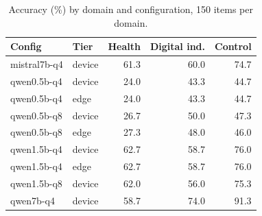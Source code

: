 \begin{table}[h]\centering\footnotesize
\caption{Accuracy (\%) by domain and configuration, 150 items per domain.}\label{tab:domain}
\begin{tabular}{@{}llrrr@{}}\toprule
Config & Tier & Health & Digital ind. & Control\\\midrule
mistral7b-q4 & device & 61.3 & 60.0 & 74.7\\
qwen0.5b-q4 & device & 24.0 & 43.3 & 44.7\\
qwen0.5b-q4 & edge & 24.0 & 43.3 & 44.7\\
qwen0.5b-q8 & device & 26.7 & 50.0 & 47.3\\
qwen0.5b-q8 & edge & 27.3 & 48.0 & 46.0\\
qwen1.5b-q4 & device & 62.7 & 58.7 & 76.0\\
qwen1.5b-q4 & edge & 62.7 & 58.7 & 76.0\\
qwen1.5b-q8 & device & 62.0 & 56.0 & 75.3\\
qwen7b-q4 & device & 58.7 & 74.0 & 91.3\\
\bottomrule\end{tabular}\end{table}
